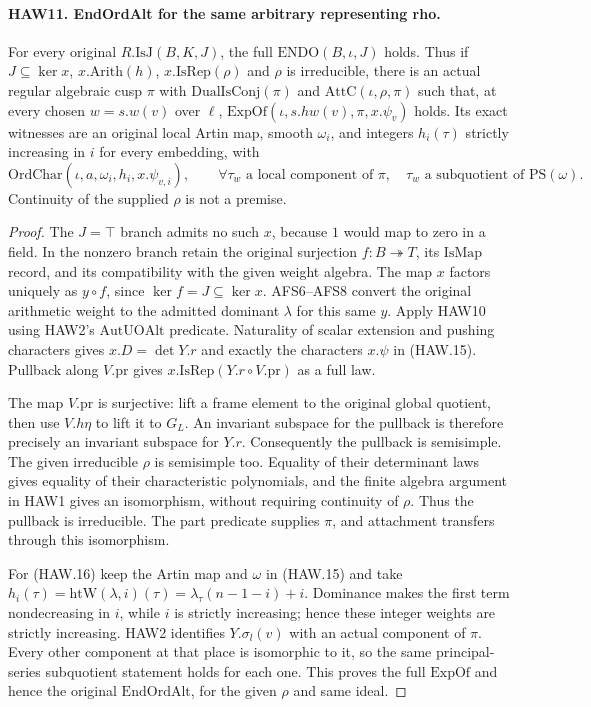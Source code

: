 \documentclass[11pt,a4paper]{article}
\numberwithin{equation}{section}
\theoremstyle{remark}\newtheorem{remark}[theorem]{Remark}
\begin{document}
\paragraph{HAW11. EndOrdAlt for the same arbitrary representing rho.}
\label{claim:HAW11}
For every original $R.\mathrm{IsJ}(B,K,J)$, the full
$\mathrm{ENDO}(B,\iota,J)$ holds.  Thus if $J\subseteq\ker x$,
$x.\mathrm{Arith}(h)$, $x.\mathrm{IsRep}(\rho)$ and $\rho$
is irreducible, there is an actual regular algebraic cusp
$\pi$ with $\mathrm{DualIsConj}(\pi)$ and
$\mathrm{AttC}(\iota,\rho,\pi)$ such that, at every chosen
$w=s.w(v)$ over $\ell$, $\mathrm{ExpOf}(\iota,s.hw(v),
\pi,x.\psi_v)$ holds.  Its exact witnesses are an original
local Artin map, smooth $\omega_i$, and integers $h_i(\tau)$
strictly increasing in $i$ for every embedding, with
\[
 \mathrm{OrdChar}(\iota,a,\omega_i,h_i,x.\psi_{v,i}),\qquad
 \forall\tau_w\text{ a local component of }\pi,\quad
                 \tau_w\text{ a subquotient of }\mathrm{PS}(\omega).
 \tag{HAW.16}
\]
Continuity of the supplied $\rho$ is not a premise.
\begin{proof}
The $J=\top$ branch admits no such $x$, because $1$ would
map to zero in a field.  In the nonzero branch retain the
original surjection $f:B\twoheadrightarrow T$, its
$\mathrm{IsMap}$ record, and its compatibility with the
given weight algebra.  The map $x$ factors uniquely as
$y\circ f$, since $\ker f=J\subseteq\ker x$.
AFS6--AFS8 convert the original arithmetic weight to the
admitted dominant $\lambda$ for this same $y$.
Apply HAW10 using HAW2's $\mathrm{AutUOAlt}$ predicate.
Naturality of scalar extension and pushing characters gives
$x.D=\det Y.r$ and exactly the characters $x.\psi$ in
(HAW.15).  Pullback along $V.\mathrm{pr}$ gives
$x.\mathrm{IsRep}(Y.r\circ V.\mathrm{pr})$ as a full law.

The map $V.\mathrm{pr}$ is surjective: lift a frame element
to the original global quotient, then use $V.h\eta$ to lift
it to $G_L$.  An invariant subspace for the pullback is
therefore precisely an invariant subspace for $Y.r$.
Consequently the pullback is semisimple.  The given
irreducible $\rho$ is semisimple too.  Equality of their
determinant laws gives equality of their characteristic
polynomials, and the finite algebra argument in HAW1 gives
an isomorphism, without requiring continuity of $\rho$.
Thus the pullback is irreducible.  The part predicate supplies
$\pi$, and attachment transfers through this isomorphism.

For (HAW.16) keep the Artin map and $\omega$ in (HAW.15)
and take
$h_i(\tau)=\mathrm{htW}(\lambda,i)(\tau)
=\lambda_\tau(n-1-i)+i$.
Dominance makes the first term nondecreasing in $i$, while
$i$ is strictly increasing; hence these integer weights are
strictly increasing.  HAW2 identifies $Y.\sigma_l(v)$ with
an actual component of $\pi$.  Every other component at
that place is isomorphic to it, so the same
principal-series subquotient statement holds for each one.
This proves the full $\mathrm{ExpOf}$ and hence the original
$\mathrm{EndOrdAlt}$, for the given $\rho$ and same ideal.
\end{proof}
\end{document}

